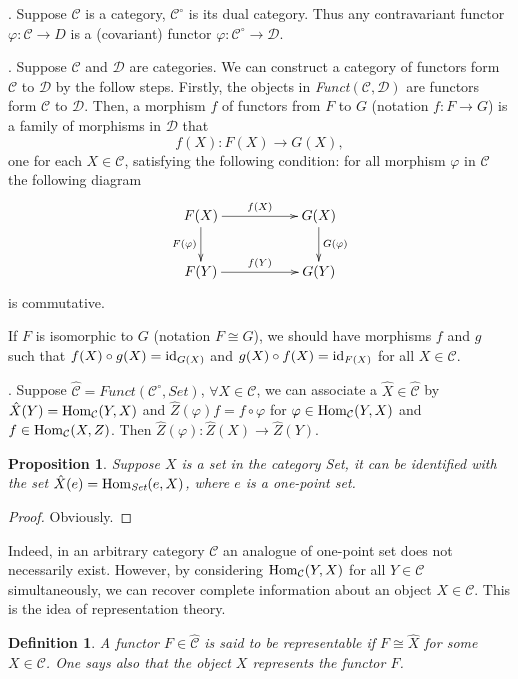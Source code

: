 \documentclass[10pt]{article}
\theoremstyle{plain}
\newtheorem{pro}{Proposition}
\newtheorem{defi}{Definition}
\newcommand{\cc}{\mathcal{C}}
\begin{document}
. Suppose $\cc$ is a category, $\cc^\circ$ is its dual category. Thus any contravariant functor $\varphi:\cc\to D$ is a (covariant) functor $\varphi:\cc^\circ\to \mathcal{D}$.

. Suppose $\cc$ and $\mathcal{D}$ are categories. We can construct a category of functors form $\cc$ to $\mathcal{D}$ by the follow steps. Firstly, the objects in \textit{Funct}$(\cc,\mathcal{D})$ are functors form $\cc$ to $\mathcal{D}$. Then, a morphism $f$ of functors from $F$ to $G$ (notation $f:F\to G$) is a family of morphisms in $\mathcal{D}$ that
\[
	f(X):F(X)\to G(X),
\]
one for each $X\in \cc$, satisfying the following condition: for all morphism $\varphi$ in $\cc$ the following diagram
\[
\begin{xy}
	\xymatrix
	{
		F(X)\ar[rr]^{f(X)} \ar[d]_{F(\varphi)}&&G(X) \ar[d]^{G(\varphi)}\\
		F(Y)\ar[rr]^{f(Y)}&&G(Y)
	}
\end{xy}
\]
is commutative.

If $F$ is isomorphic to $G$ (notation $F\cong G$), we should have morphisms $f$ and $g$ such that $f(X)\circ g(X)=\operatorname{id}_{G(X)}$ and $g(X)\circ f(X)=\operatorname{id}_{F(X)}$ for all $X\in \cc$.

. Suppose $\hat{\cc}=\textit{Funct}(\cc^\circ,\textit{Set})$, $\forall X\in \cc$, we can associate a $\hat{X}\in \hat{\cc}$ by $\hat{X}(Y)=\Hom_\cc(Y,X)$ and $\hat{Z}(\varphi)f=f\circ \varphi$ for $\varphi \in \Hom_\cc(Y,X)$ and $f\in \Hom_\cc(X,Z)$. Then $\hat{Z}(\varphi):\hat{Z}(X)\to \hat{Z}(Y)$.

\begin{pro}
	Suppose $X$ is a set in the category \textit{Set}, it can be identified with the set $\hat{X}(e)=\operatorname{Hom}_{\textit{Set}}(e,X)$, where $e$ is a one-point set.
\end{pro}
\begin{proof}
	Obviously.
\end{proof}

Indeed, in an arbitrary category $\cc$ an analogue of one-point set does not necessarily exist. However, by considering $\Hom_{\cc}(Y,X)$ for all $Y\in \cc$ simultaneously, we can recover complete information about an object $X\in \cc$. This is the idea of representation theory.

\begin{defi}
	A functor $F\in \hat{\cc}$ is said to be representable if $F\cong \hat{X}$ for some $X\in \cc$. One says also that the object $X$ represents the functor $F$.
\end{defi}
\end{document}

